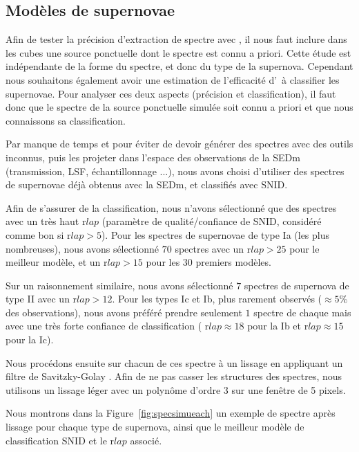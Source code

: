 \documentclass[../main/main.tex]{subfiles}
\begin{document}
\subsection{Modèles de supernovae}

Afin de tester la précision d'extraction de spectre avec \hypergal, il nous faut inclure dans les cubes une source ponctuelle dont le
spectre est connu a priori. Cette étude est indépendante de la forme du spectre, et donc du type
de la supernova.
Cependant nous souhaitons également avoir une
estimation de l'efficacité d'\hypergal\ à classifier les supernovae.
Pour analyser ces deux aspects (précision et classification), il faut
donc que le spectre de la source ponctuelle simulée soit connu a priori et que nous connaissons sa classification.

Par manque de temps et pour éviter de devoir générer des spectres avec
des outils inconnus, puis les projeter dans l'espace des observations de
la SEDm (transmission, LSF, échantillonnage ...), nous avons choisi
d'utiliser des spectres de supernovae déjà obtenus avec la SEDm, et
classifiés avec SNID.

Afin de s'assurer de la classification, nous n'avons sélectionné que des
spectres avec un très haut r$lap$ (paramètre de qualité/confiance de SNID, considéré
comme bon si r$lap>5$). Pour les spectres de supernovae de type Ia (les plus nombreuses), nous avons
sélectionné $70$ spectres avec un r$lap>25$ pour le meilleur modèle, et un r$lap>15$ pour les 30 premiers modèles.

Sur un raisonnement similaire, nous avons sélectionné $7$ spectres de
supernova de type II avec un r$lap>12$. Pour les types Ic et Ib, plus
rarement observés ($\approx5\%$ des observations), nous avons préféré
prendre seulement $1$ spectre de chaque mais avec une très forte
confiance de classification ( r$lap\approx18$ pour la Ib et r$lap\approx15$
pour la Ic).

Nous procédons ensuite sur chacun de ces spectre à un lissage en
appliquant un filtre de Savitzky-Golay \citep{SavitzkyGolay}. Afin de ne pas casser les
structures des spectres, nous utilisons un lissage léger avec un
polynôme d'ordre 3 sur une fenêtre de 5 pixels.

Nous montrons dans la Figure~\ref{fig:specsimueach} un exemple de
spectre après lissage pour chaque type de supernova, ainsi que le
meilleur modèle de classification SNID et le r$lap$ associé.
\end{document}
